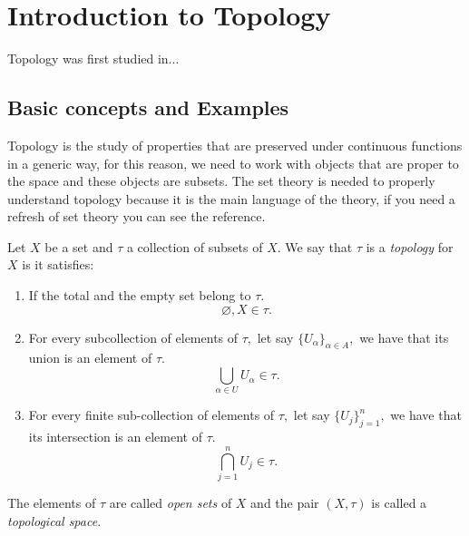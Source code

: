 \documentclass[
	fontsize=10pt, %
	twoside=false, %
	secnumdepth=1, %
]{kaobook}
\begin{document}
\listoftables %

\endgroup


\mainmatter %

\chapter{Introduction to Topology}


Topology was first studied in...

\section{Basic concepts and Examples}

Topology is the study of properties that are preserved under continuous functions in a generic way, for this reason, we need to work with objects that are proper to the space and these objects are subsets. The set theory is needed to properly understand topology because it is the main language of the theory, if you need a refresh of set theory you can see the reference.

\begin{definition}
Let $X$ be a set and $\tau$ a collection of subsets of $X.$ We say that $\tau$ is a \emph{topology} for $X$ is it satisfies:
\begin{enumerate}
\item If the total and the empty set belong to $\tau.$ $$\varnothing, X\in\tau.$$

\item For every subcollection of elements of $\tau,$ let say $\{U_\alpha\}_{\alpha\in A},$ we have that its union is an element of $\tau.$ $$\bigcup_{\alpha \in U} U_\alpha \in \tau.$$

\item For every finite sub-collection of elements of $\tau,$ let say $\{U_j\}_{j=1}^n,$ we have that its intersection is an element of $\tau.$ $$ \bigcap_{j=1}^n U_j\in\tau.$$
\end{enumerate}

The elements of $\tau$ are called \emph{open sets} of $X$ and the pair $(X,\tau)$ is called a \emph{topological space}.
\end{definition}
\end{document}
